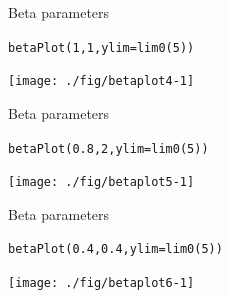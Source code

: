 \documentclass[xcolor=table,           xcolor=dvipsnames]{beamer}\usepackage[]{graphicx}\usepackage[]{color}
\makeatletter
\newcommand{\hlnum}[1]{\textcolor[rgb]{0,0,0}{#1}}
\newcommand{\hlstd}[1]{\textcolor[rgb]{0,0,0}{#1}}
\newcommand{\hlkwc}[1]{\textcolor[rgb]{1,0,1}{#1}}
\newcommand{\hlkwd}[1]{\textcolor[rgb]{0,0,1}{#1}}
\newenvironment{kframe}{%
 \def\at@end@of@kframe{}%
 \ifinner\ifhmode%
  \def\at@end@of@kframe{\end{minipage}}%
  \begin{minipage}{\columnwidth}%
 \fi\fi%
 \def\FrameCommand##1{\hskip\@totalleftmargin \hskip-\fboxsep
 \colorbox{shadecolor}{##1}\hskip-\fboxsep
     \hskip-\linewidth \hskip-\@totalleftmargin \hskip\columnwidth}%
 \MakeFramed {\advance\hsize-\width
   \@totalleftmargin\z@ \linewidth\hsize
   \@setminipage}}%
 {\par\unskip\endMakeFramed%
 \at@end@of@kframe}
\newenvironment{knitrout}{}{} %
\makeatother
\begin{document}

\begin{frame}[fragile]{Beta parameters}
\begin{knitrout}
\color{fgcolor}\begin{kframe}
\begin{alltt}
\hlkwd{betaPlot}\hlstd{(}\hlnum{1}\hlstd{,} \hlnum{1}\hlstd{,} \hlkwc{ylim}\hlstd{=}\hlkwd{lim0}\hlstd{(}\hlnum{5}\hlstd{))}
\end{alltt}
\end{kframe}

{\centering \texttt{[image: ./fig/betaplot4-1]} 

}



\end{knitrout}
\end{frame}


\begin{frame}[fragile]{Beta parameters}
\begin{knitrout}
\color{fgcolor}\begin{kframe}
\begin{alltt}
\hlkwd{betaPlot}\hlstd{(}\hlnum{0.8}\hlstd{,} \hlnum{2}\hlstd{,} \hlkwc{ylim}\hlstd{=}\hlkwd{lim0}\hlstd{(}\hlnum{5}\hlstd{))}
\end{alltt}
\end{kframe}

{\centering \texttt{[image: ./fig/betaplot5-1]} 

}



\end{knitrout}
\end{frame}


\begin{frame}[fragile]{Beta parameters}
\begin{knitrout}
\color{fgcolor}\begin{kframe}
\begin{alltt}
\hlkwd{betaPlot}\hlstd{(}\hlnum{0.4}\hlstd{,} \hlnum{0.4}\hlstd{,} \hlkwc{ylim}\hlstd{=}\hlkwd{lim0}\hlstd{(}\hlnum{5}\hlstd{))}
\end{alltt}
\end{kframe}

{\centering \texttt{[image: ./fig/betaplot6-1]} 

}



\end{knitrout}
\end{frame}
\end{document}
